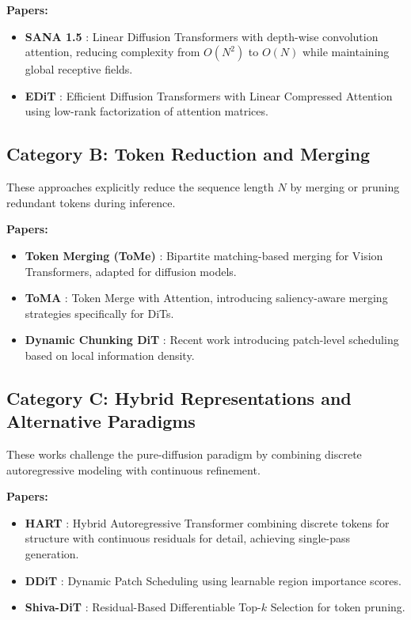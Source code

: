 \documentclass{article}
\begin{document}
\textbf{Papers:}
\begin{itemize}
    \item \textbf{SANA 1.5} \cite{xie2025sana}: Linear Diffusion Transformers
          with depth-wise convolution attention, reducing complexity from $O(N^2)$ to
          $O(N)$ while maintaining global receptive fields.
    \item \textbf{EDiT} \cite{becker2025edit}: Efficient Diffusion Transformers
          with Linear Compressed Attention using low-rank factorization of attention
          matrices.
\end{itemize}

\subsection{Category B: Token Reduction and Merging}
These approaches explicitly reduce the sequence length $N$ by merging or
pruning redundant tokens during inference.

\textbf{Papers:}
\begin{itemize}
    \item \textbf{Token Merging (ToMe)} \cite{bolya2023token}: Bipartite
          matching-based merging for Vision Transformers, adapted for diffusion models.
    \item \textbf{ToMA} \cite{lu2025toma}: Token Merge with Attention,
          introducing saliency-aware merging strategies specifically for DiTs.
    \item \textbf{Dynamic Chunking DiT} \cite{haridas2026dynamic}: Recent work
          introducing patch-level scheduling based on local information density.
\end{itemize}

\subsection{Category C: Hybrid Representations and Alternative Paradigms}
These works challenge the pure-diffusion paradigm by combining discrete
autoregressive modeling with continuous refinement.

\textbf{Papers:}
\begin{itemize}
    \item \textbf{HART} \cite{tang2024hart}: Hybrid Autoregressive Transformer
          combining discrete tokens for structure with continuous residuals for
          detail, achieving single-pass generation.
    \item \textbf{DDiT} \cite{kim2026ddit}: Dynamic Patch Scheduling using
          learnable region importance scores.
    \item \textbf{Shiva-DiT} \cite{zhang2026shiva}: Residual-Based
          Differentiable Top-$k$ Selection for token pruning.
\end{itemize}
\end{document}
